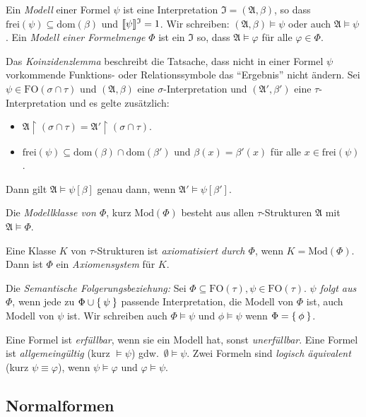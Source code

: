 \documentclass[a4paper,parskip=half*,DIV=15,fontsize=11pt]{scrartcl}
\DeclarePairedDelimiter\interpret{\llbracket}{\rrbracket}
\newcommand{\J}{\mathfrak{I}}
\newcommand{\A}{\mathfrak{A}}
\newcommand{\FO}{\mathrm{FO}}
\newcommand{\dom}{\mathrm{dom}}
\newcommand{\frei}{\mathrm{frei}}
\newcommand{\Mod}{\mathrm{Mod}}
\begin{document}
Ein \emph{Modell} einer Formel $\psi$ ist eine Interpretation $\J = (\A, \beta)$, so dass $\frei(\psi) \subseteq \dom(\beta)$ und $\interpret{\psi}^\J = 1$. Wir schreiben: $(\A, \beta) \models \psi$ oder auch $\A \models \psi$. Ein \emph{Modell einer Formelmenge} $\Phi$ ist ein $\J$ so, dass $\A \models \varphi$ für alle $\varphi \in \Phi$.

Das \emph{Koinzidenzlemma} beschreibt die Tatsache, dass nicht in einer Formel $\psi$ vorkommende Funktions- oder Relationssymbole das ``Ergebnis'' nicht ändern. Sei $\psi \in \FO(\sigma \cap \tau)$ und $(\A, \beta)$ eine $\sigma$-Interpretation und $(\A', \beta')$ eine $\tau$-Interpretation und es gelte zusätzlich:
\begin{itemize}
    \item $\A \upharpoonright (\sigma \cap \tau) = \A' \upharpoonright (\sigma \cap \tau)$.
    \item $\frei(\psi) \subseteq \dom(\beta) \cap \dom(\beta')$ und $\beta(x) = \beta'(x)$ für alle $x \in \frei(\psi)$.
\end{itemize}

Dann gilt $\A \models \psi[\beta]$ genau dann, wenn $\A' \models \psi[\beta']$.

Die \emph{Modellklasse von $\Phi$}, kurz $\Mod(\Phi)$ besteht aus allen $\tau$-Strukturen $\A$ mit $\A \models \Phi$.

Eine Klasse $K$ von $\tau$-Strukturen ist \emph{axiomatisiert durch $\Phi$}, wenn $K = \Mod(\Phi)$. Dann ist $\Phi$ ein \emph{Axiomensystem} für $K$.

Die \emph{Semantische Folgerungsbeziehung:} Sei $\Phi \subseteq \FO(\tau), \psi \in \FO(\tau)$. \emph{$\psi$ folgt aus $\Phi$}, wenn jede zu $\Phi \cup \Set{\psi}$ passende Interpretation, die Modell von $\Phi$ ist, auch Modell von $\psi$ ist. Wir schreiben auch $\Phi \models \psi$ und $\phi \models \psi$ wenn $\Phi = \Set{\phi}$.

Eine Formel ist \emph{erfüllbar}, wenn sie ein Modell hat, sonst \emph{unerfüllbar}. Eine Formel ist \emph{allgemeingültig} (kurz $\models \psi$) gdw.\ $\emptyset \models \psi$. Zwei Formeln sind \emph{logisch äquivalent} (kurz $\psi \equiv \varphi$), wenn $\psi \models \varphi$ und $\varphi \models \psi$.


\subsection{Normalformen}
\end{document}
